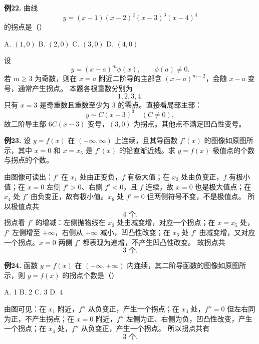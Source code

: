 \begin{problemblock}
\textbf{例22.} 曲线
\[
y=(x-1)(x-2)^2(x-3)^3(x-4)^4
\]
的拐点是（\quad）

A. \((1,0)\) \qquad B. \((2,0)\) \qquad C. \((3,0)\) \qquad D. \((4,0)\)
\end{problemblock}
\begin{solutionblock}
设
\[
y=(x-a)^m\phi(x),\qquad \phi(a)\ne0.
\]
若 \(m\ge3\) 为奇数，则在 \(x=a\) 附近二阶导的主部含 \((x-a)^{m-2}\)，会随 \(x-a\) 变号，通常产生拐点。
本题各根重数分别为
\[
1,2,3,4.
\]
只有 \(x=3\) 是奇重数且重数至少为 3 的零点。直接看局部主部：
\[
y\sim C(x-3)^3\quad(C\ne0),
\]
故二阶导主部 \(6C(x-3)\) 变号，\((3,0)\) 为拐点。其他点不满足凹凸性变号。
\end{solutionblock}

\begin{problemblock}
\textbf{例23.} 设 \(y=f(x)\) 在 \((-
\infty,\infty)\) 上连续，且其导函数 \(f'(x)\) 的图像如原图所示，其中 \(x=0\) 和 \(x=x_5\) 是 \(f'(x)\) 的铅直渐近线。求 \(y=f(x)\) 极值点的个数与拐点的个数。
\end{problemblock}
\begin{solutionblock}
由图像可读出：\(f'\) 在 \(x_1\) 处由正变负，\(f\) 有极大值；在 \(x_3\) 处由负变正，\(f\) 有极小值；在 \(x=0\) 左侧 \(f'>0\)、右侧 \(f'<0\)，且 \(f\) 连续，故 \(x=0\) 也是极大值点；在 \(x_4\) 处 \(f'\) 由负变正，故有极小值。\(x_6\) 处 \(f'=0\) 但两侧符号不变，不是极值点。
所以极值点共
\[
4\text{ 个}.
\]
拐点看 \(f'\) 的增减：左侧抛物线在 \(x_2\) 处由减变增，对应一个拐点；在 \(x=x_5\) 处，\(f'\) 左侧增至 \(+\infty\)，右侧从 \(+\infty\) 减小，凹凸性改变；在 \(x_6\) 处 \(f'\) 由减变增，又对应一个拐点。\(x=0\) 两侧 \(f'\) 都表现为递增，不产生凹凸性改变。
故拐点共
\[
3\text{ 个}.
\]
\end{solutionblock}

\begin{problemblock}
\textbf{例24.} 函数 \(y=f(x)\) 在 \((-
\infty,+\infty)\) 内连续，其二阶导函数的图像如原图所示，则 \(y=f(x)\) 的拐点个数是（\quad）

A. 1 \qquad B. 2 \qquad C. 3 \qquad D. 4
\end{problemblock}
\begin{solutionblock}
由图可见：在 \(x_1\) 附近，\(f''\) 从负变正，产生一个拐点；在 \(x_3\) 处，\(f''=0\) 但左右同为正，不产生拐点；在 \(x=0\) 附近，\(f''\) 左侧为正、右侧为负，凹凸性改变，产生一个拐点；在 \(x_4\) 处，\(f''\) 从负变正，产生一个拐点。
所以拐点共有
\[
3\text{ 个}.
\]
\end{solutionblock}
